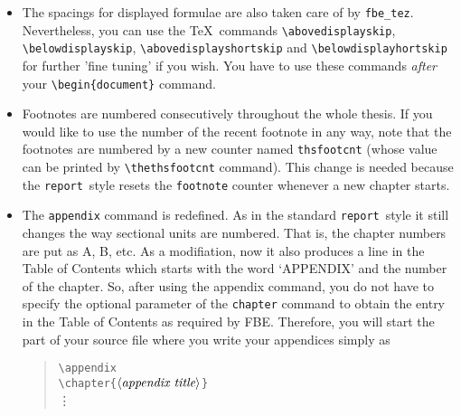 \documentclass[12pt]{article}
\newcommand\fbe{{\tt fbe\_tez}}
\newcommand\report{{\tt report}}
\newcommand{\bq}{\begin{quotation}\noindent}
\newcommand{\eq}{\end{quotation}}
\renewcommand{\arg}[1]{$\langle\mbox{\it #1}\rangle$}
\begin{document}
\begin{itemize}
  are provided. The line spacing is 1.5, except in footnotes and
  quotations, where single line spacing has to be used. There is an extra
  1.5 space between the paragraphs. Also note that the
  \verb/\raggedbottom/ command is in effect. Therefore, the bottom
  margin might vary a bit from page to page. You can invoke the
  \verb/\flushbottom/ command in the preamble of your document if you
  wish. Nevertheless, this is not recommended for theses, which
  include pages with long formulae or large figures and are sparse in
  regular text, since the spacing in such pages might look ugly.
\item The spacings for displayed formulae are also taken care of by
  \fbe. Nevertheless, you can use the \TeX\ commands
  \verb/\abovedisplayskip/, \verb/\belowdisplayskip/,
  \verb/\abovedisplayshortskip/ and \verb/\belowdisplayhortskip/  for
  further 'fine tuning' if you wish. You have to use these commands
  {\em after} your \verb/\begin{document}/ command.
\item Footnotes are numbered consecutively throughout the whole
  thesis. If you would like to use the number of the recent footnote
  in any way, note that the footnotes are numbered by a new counter
  named {\tt thsfootcnt} (whose value can be printed by
  \verb/\thethsfootcnt/ command). This change is needed because the
  \report\ style resets the {\tt footnote} counter whenever a new
  chapter starts.
\item The {\tt appendix} command is redefined. As in the standard
  \report\ style it still changes the way sectional units are
  numbered. That is, the chapter numbers are put as A, B, etc. As a
  modifiation, now it also produces a line in the Table of Contents
  which starts with the word `APPENDIX' and the number of the chapter.
  So, after using the appendix command, you do not have to specify the
  optional parameter of the {\tt chapter} command to obtain the entry
  in the Table of Contents as required by FBE. Therefore, you will
  start the part of your source file where you write your appendices
  simply as
\bq
\verb/\appendix/ \\
\verb/\chapter{/\arg{appendix title}\verb/}/ \\
\verb//\vdots \\
\eq
\end{itemize}
\end{document}
